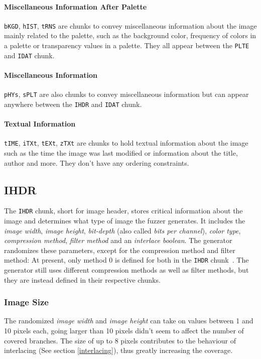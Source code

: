 \documentclass[runningheads]{llncs}
\begin{document}
\paragraph{Miscellaneous Information After Palette}
\texttt{bKGD}, \texttt{hIST}, \texttt{tRNS} are chunks to convey miscellaneous information about the image mainly related to the palette, such as the background color, frequency of colors in a palette or transparency values in a palette. They all appear between the \texttt{PLTE} and \texttt{IDAT} chunk.

\paragraph{Miscellaneous Information}
\texttt{pHYs}, \texttt{sPLT} are also chunks to convey miscellaneous information but can appear anywhere between the \texttt{IHDR} and \texttt{IDAT} chunk.

\paragraph{Textual Information}
\texttt{tIME}, \texttt{iTXt}, \texttt{tEXt}, \texttt{zTXt} are chunks to hold textual information about the image such as the time the image was last modified or information about the title, author and more. They don't have any ordering constraints.

\subsection{IHDR}
The \texttt{IHDR} chunk, short for image header, stores critical information about the image and determines what type of image the fuzzer generates.
It includes the \textit{image width}, \textit{image height}, \textit{bit-depth} (also called \textit{bits per channel}), \textit{color type}, \textit{compression method}, \textit{filter method} and an \textit{interlace boolean}.
The generator randomizes these parameters, except for the compression method and filter method: At present, only method 0 is defined for both in the \texttt{IHDR} chunk~\cite{libpng_chunks}. The generator still uses different compression methods as well as filter methods, but they are instead defined in their respective chunks.

\subsubsection{Image Size}
The randomized \textit{image width} and \textit{image height} can take on values between 1 and 10 pixels each, going larger than 10 pixels didn't seem to affect the number of covered branches. 
The size of up to 8 pixels contributes to the behaviour of interlacing (See section \ref{interlacing}), thus greatly increasing the coverage.
\end{document}
